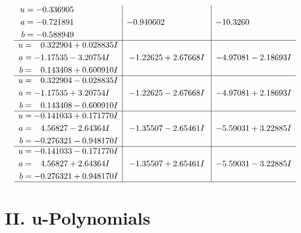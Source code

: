 \documentclass[1p]{elsarticle_modified}
\theoremstyle{definition}
\begin{document}
$$\begin{array}{c|c|c}
\begin{aligned}
u &= -0.336905\phantom{ +0.000000I} \\
a &= -0.721891\phantom{ +0.000000I} \\
b &= -0.588949\phantom{ +0.000000I}\end{aligned}
 & -0.940602\phantom{ +0.000000I} & -10.3260\phantom{ +0.000000I} \\ \hline\begin{aligned}
u &= \phantom{-}0.322904 + 0.028835 I \\
a &= -1.17535 - 3.20754 I \\
b &= \phantom{-}0.143408 + 0.600910 I\end{aligned}
 & -1.22625 + 2.67668 I & -4.97081 - 2.18693 I \\ \hline\begin{aligned}
u &= \phantom{-}0.322904 - 0.028835 I \\
a &= -1.17535 + 3.20754 I \\
b &= \phantom{-}0.143408 - 0.600910 I\end{aligned}
 & -1.22625 - 2.67668 I & -4.97081 + 2.18693 I \\ \hline\begin{aligned}
u &= -0.141033 + 0.171770 I \\
a &= \phantom{-}4.56827 - 2.64364 I \\
b &= -0.276321 - 0.948170 I\end{aligned}
 & -1.35507 - 2.65461 I & -5.59031 + 3.22885 I \\ \hline\begin{aligned}
u &= -0.141033 - 0.171770 I \\
a &= \phantom{-}4.56827 + 2.64364 I \\
b &= -0.276321 + 0.948170 I\end{aligned}
 & -1.35507 + 2.65461 I & -5.59031 - 3.22885 I\\
 \hline 
 \end{array}$$\newpage
\newpage\renewcommand{\arraystretch}{1}
\centering \section*{ II. u-Polynomials}
\end{document}
